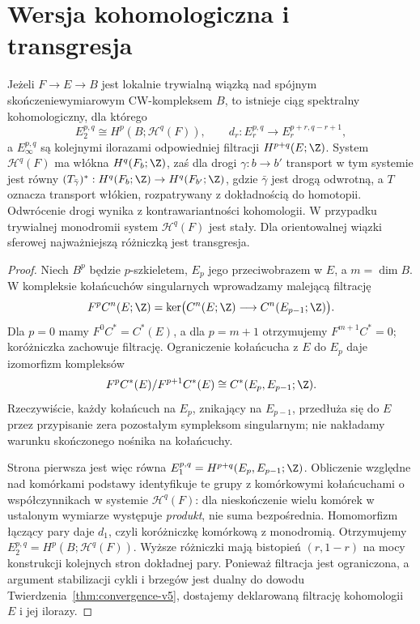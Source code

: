 \section{Wersja kohomologiczna i transgresja}
\begin{twierdzenie}
Jeżeli $F\to E\to B$ jest lokalnie trywialną wiązką
nad spójnym skończeniewymiarowym CW-kompleksem $B$, to istnieje ciąg spektralny
kohomologiczny, dla którego
\[
E_2^{p,q}\cong H^p(B;\mathcal H^q(F)),\qquad
 d_r:E_r^{p,q}\longrightarrow E_r^{p+r,q-r+1},
\]
a $E_\infty^{p,q}$ są kolejnymi ilorazami odpowiedniej
filtracji $H^{p+q}(E;\Z)$. System $\mathcal H^q(F)$
ma włókna $H^q(F_b;\Z)$, zaś dla drogi $\gamma:b\to b'$
transport w tym systemie jest równy
$(T_{\bar\gamma})^*:H^q(F_b;\Z)\to H^q(F_{b'};\Z)$,
gdzie $\bar\gamma$ jest drogą odwrotną, a $T$ oznacza
transport włókien, rozpatrywany z dokładnością do homotopii.
Odwrócenie drogi wynika z kontrawariantności kohomologii.
W przypadku trywialnej monodromii
system $\mathcal H^q(F)$ jest stały. Dla orientowalnej
wiązki sferowej najważniejszą różniczką jest transgresja.
\end{twierdzenie}
\begin{proof}
Niech $B^p$ będzie $p$-szkieletem, $E_p$ jego przeciwobrazem
w $E$, a $m=\dim B$. W kompleksie kołańcuchów singularnych
wprowadzamy malejącą filtrację
\[
 F^pC^n(E;\Z)=
 \ker\bigl(C^n(E;\Z)\longrightarrow C^n(E_{p-1};\Z)\bigr).
\]
Dla $p=0$ mamy $F^0C^*=C^*(E)$, a dla $p=m+1$
otrzymujemy $F^{m+1}C^*=0$; koróżniczka zachowuje
filtrację. Ograniczenie kołańcucha z $E$ do $E_p$ daje
izomorfizm kompleksów
\[
 F^pC^*(E)/F^{p+1}C^*(E)
 \cong C^*(E_p,E_{p-1};\Z).
\]
Rzeczywiście, każdy kołańcuch na $E_p$, znikający na
$E_{p-1}$, przedłuża się do $E$ przez przypisanie zera
pozostałym sympleksom singularnym; nie nakładamy warunku
skończonego nośnika na kołańcuchy.

Strona pierwsza jest więc równa
$E_1^{p,q}=H^{p+q}(E_p,E_{p-1};\Z)$.
Obliczenie względne nad komórkami podstawy identyfikuje
te grupy z komórkowymi kołańcuchami o współczynnikach
w systemie $\mathcal H^q(F)$: dla nieskończenie wielu
komórek w ustalonym wymiarze występuje \emph{produkt},
nie suma bezpośrednia. Homomorfizm łączący pary daje
$d_1$, czyli koróżniczkę komórkową z monodromią.
Otrzymujemy $E_2^{p,q}=H^p(B;\mathcal H^q(F))$.
Wyższe różniczki mają bistopień $(r,1-r)$ na mocy
konstrukcji kolejnych stron dokładnej pary.
Ponieważ filtracja jest ograniczona, a argument
stabilizacji cykli i brzegów jest dualny do dowodu
Twierdzenia~\ref{thm:convergence-v5}, dostajemy
deklarowaną filtrację kohomologii $E$ i jej ilorazy.
\end{proof}
